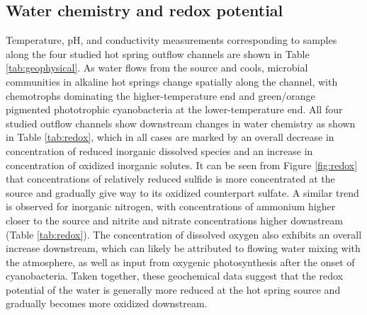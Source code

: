 \subsection{Water chemistry and redox potential} Temperature, pH, and conductivity measurements corresponding to samples along the four studied hot spring outflow channels are shown in Table \ref{tab:geophysical}. As water flows from the source and cools, microbial communities in alkaline hot springs change spatially along the channel, with chemotrophs dominating the higher-temperature end and green/orange pigmented phototrophic cyanobacteria at the lower-temperature end. All four studied outflow channels show downstream changes in water chemistry as shown in Table \ref{tab:redox}, which in all cases are marked by an overall decrease in concentration of reduced inorganic dissolved species and an increase in concentration of oxidized inorganic solutes. It can be seen from Figure \ref{fig:redox} that concentrations of relatively reduced sulfide is more concentrated at the source and gradually give way to its oxidized counterpart sulfate. A similar trend is observed for inorganic nitrogen, with concentrations of ammonium higher closer to the source and nitrite and nitrate concentrations higher downstream (Table \ref{tab:redox}). The concentration of dissolved oxygen also exhibits an overall increase downstream, which can likely be attributed to flowing water mixing with the atmosphere, as well as input from oxygenic photosynthesis after the onset of cyanobacteria. Taken together, these geochemical data suggest that the redox potential of the water is generally more reduced at the hot spring source and gradually becomes more oxidized downstream.


